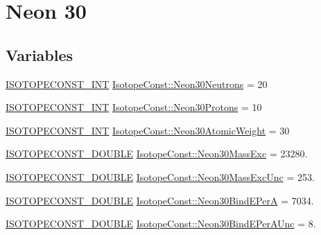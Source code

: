 \hypertarget{group___isotope_const-_neon-_ne30}{}\section{Neon 30}
\label{group___isotope_const-_neon-_ne30}
\subsection*{Variables}
\begin{DoxyCompactItemize}
\item 
\mbox{\hyperlink{group___isotope_const-_macros_ga5f18360b3e99483a35c32d789e62621c}{I\+S\+O\+T\+O\+P\+E\+C\+O\+N\+S\+T\+\_\+\+I\+NT}} \mbox{\hyperlink{group___isotope_const-_neon-_ne30_gae893aba3c21b533cc109327e082c8c92}{Isotope\+Const\+::\+Neon30\+Neutrons}} = 20
\item 
\mbox{\hyperlink{group___isotope_const-_macros_ga5f18360b3e99483a35c32d789e62621c}{I\+S\+O\+T\+O\+P\+E\+C\+O\+N\+S\+T\+\_\+\+I\+NT}} \mbox{\hyperlink{group___isotope_const-_neon-_ne30_ga7c27a5443ce6f3b65a4afd1739e38874}{Isotope\+Const\+::\+Neon30\+Protons}} = 10
\item 
\mbox{\hyperlink{group___isotope_const-_macros_ga5f18360b3e99483a35c32d789e62621c}{I\+S\+O\+T\+O\+P\+E\+C\+O\+N\+S\+T\+\_\+\+I\+NT}} \mbox{\hyperlink{group___isotope_const-_neon-_ne30_ga9a5c4598a3417448d1c52008aba43c01}{Isotope\+Const\+::\+Neon30\+Atomic\+Weight}} = 30
\item 
\mbox{\hyperlink{group___isotope_const-_macros_ga8f45a7272ce02c0b4c65c44636ed719a}{I\+S\+O\+T\+O\+P\+E\+C\+O\+N\+S\+T\+\_\+\+D\+O\+U\+B\+LE}} \mbox{\hyperlink{group___isotope_const-_neon-_ne30_ga4de7272a5efca90b12daa9debf4dbdec}{Isotope\+Const\+::\+Neon30\+Mass\+Exc}} = 23280.
\item 
\mbox{\hyperlink{group___isotope_const-_macros_ga8f45a7272ce02c0b4c65c44636ed719a}{I\+S\+O\+T\+O\+P\+E\+C\+O\+N\+S\+T\+\_\+\+D\+O\+U\+B\+LE}} \mbox{\hyperlink{group___isotope_const-_neon-_ne30_gaad0c4113c10e20e92585ccbcd0efb92e}{Isotope\+Const\+::\+Neon30\+Mass\+Exc\+Unc}} = 253.
\item 
\mbox{\hyperlink{group___isotope_const-_macros_ga8f45a7272ce02c0b4c65c44636ed719a}{I\+S\+O\+T\+O\+P\+E\+C\+O\+N\+S\+T\+\_\+\+D\+O\+U\+B\+LE}} \mbox{\hyperlink{group___isotope_const-_neon-_ne30_ga6d48c333b8a0d3e34b5a10d2faed2f64}{Isotope\+Const\+::\+Neon30\+Bind\+E\+PerA}} = 7034.
\item 
\mbox{\hyperlink{group___isotope_const-_macros_ga8f45a7272ce02c0b4c65c44636ed719a}{I\+S\+O\+T\+O\+P\+E\+C\+O\+N\+S\+T\+\_\+\+D\+O\+U\+B\+LE}} \mbox{\hyperlink{group___isotope_const-_neon-_ne30_gaa15f4bb3956c29a4e83572114e04a529}{Isotope\+Const\+::\+Neon30\+Bind\+E\+Per\+A\+Unc}} = 8.

\end{DoxyCompactItemize}
